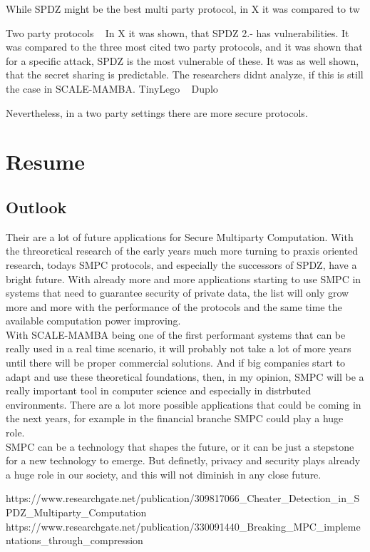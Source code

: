 \documentclass[english,runningheads,a4paper]{llncs}[2018/03/10]
\begin{document}
While SPDZ might be the best multi party protocol, in X it was compared to tw

Two party protocols
~\cite{MPCCompression}
In X it was shown, that SPDZ 2.- has vulnerabilities. It was compared to the three most cited two party protocols, and it was shown that for a specific attack, SPDZ is the most vulnerable of these. It was as well shown, that the secret sharing is predictable. The researchers didnt analyze, if this is still the case in SCALE-MAMBA.
TinyLego ~\cite{TinyLego}
Duplo ~\cite{Duplo}
~\cite{Aby}

Nevertheless, in a two party settings there are more secure protocols.


\section{Resume}\label{sec:outlook}

\subsection{Outlook}
Their are a lot of future applications for Secure Multiparty Computation. With the threoretical research of the early years much more turning to praxis oriented research, todays SMPC protocols, and especially the successors of SPDZ, have a bright future. With already more and more applications starting to use SMPC in systems that need to guarantee security of private data, the list will only grow more and more with the performance of the protocols and the same time the available computation power improving. \\
With SCALE-MAMBA being one of the first performant systems that can be really used in a real time scenario, it will probably not take a lot of more years until there will be proper commercial solutions. And if big companies start to adapt and use these theoretical foundations, then, in my opinion, SMPC will be a really important tool in computer science and especially in distrbuted environments. There are a lot more possible applications that could be coming in the next years, for example in the financial branche SMPC could play a huge role.\\
SMPC can be a technology that shapes the future, or it can be just a stepstone for a new technology to emerge. But definetly, privacy and security plays already a huge role in our society, and this will not diminish in any close future.


https://www.researchgate.net/publication/309817066\_Cheater\_Detection\_in\_SPDZ\_Multiparty\_Computation
https://www.researchgate.net/publication/330091440\_Breaking\_MPC\_implementations\_through\_compression
\end{document}

